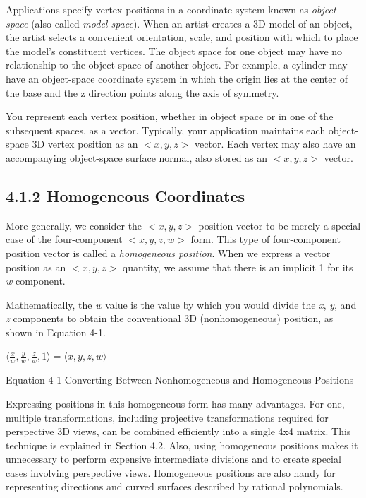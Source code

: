\documentclass{book}
\begin{document}
Applications specify vertex positions in a coordinate system known as \textit{object space} (also called \textit{model space}). When an artist creates a 3D model of an object, the artist selects a convenient orientation, scale, and position with which to place the model's constituent vertices. The object space for one object may have no relationship to the object space of another object. For example, a cylinder may have an object-space coordinate system in which the origin lies at the center of the base and the z direction points along the axis of symmetry.

You represent each vertex position, whether in object space or in one of the subsequent spaces, as a vector. Typically, your application maintains each object-space 3D vertex position as an $<x, y, z>$ vector. Each vertex may also have an accompanying object-space surface normal, also stored as an $<x, y, z>$ vector.

\subsection{4.1.2 Homogeneous Coordinates}

More generally, we consider the $<x, y, z>$ position vector to be merely a special case of the four-component $<x, y, z, w>$ form. This type of four-component position vector is called a \textit{homogeneous position}. When we express a vector position as an $<x, y, z>$ quantity, we assume that there is an implicit 1 for its \textit{w} component.

Mathematically, the \textit{w} value is the value by which you would divide the \textit{x}, \textit{y}, and \textit{z} components to obtain the conventional 3D (nonhomogeneous) position, as shown in Equation 4-1.

\FloatBarrier
\begin{equationcaption}
$
\langle \frac{x}{w},\frac{y}{w},\frac{z}{w},1 \rangle = \langle x,y,z,w \rangle
$
\caption{Equation 4-1 Converting Between Nonhomogeneous and Homogeneous Positions}
\end{equationcaption}
\FloatBarrier

Expressing positions in this homogeneous form has many advantages. For one, multiple transformations, including projective transformations required for perspective 3D views, can be combined efficiently into a single 4x4 matrix. This technique is explained in Section 4.2. Also, using homogeneous positions makes it unnecessary to perform expensive intermediate divisions and to create special cases involving perspective views. Homogeneous positions are also handy for representing directions and curved surfaces described by rational polynomials.
\end{document}
